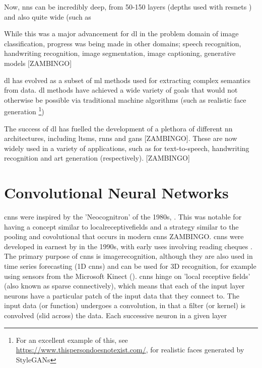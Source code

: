 Now, \gls{nn}s can be incredibly deep, from 50-150 layers (depths used with \gls{resnet}s \cite{resnet}) and also quite wide (such as 


While this was a major advancement for \gls{dl} in the problem domain of image classification, progress was being made in other domains; speech recognition, handwriting recognition, image segmentation, image captioning, generative models [ZAMBINGO] \bigskip %
 
\gls{dl} has evolved as a subset of \gls{ml} methods used for extracting complex semantics from data. \gls{dl} methods have achieved a wide variety of goals that would not otherwise be possible via traditional machine algorithms (such as realistic face generation \footnote{For an excellent example of this, see \url{https://www.thispersondoesnotexist.com/}, for realistic faces generated by StyleGANs})  \bigskip%

The success of  \gls{dl} has fuelled the development of a plethora of different  \gls{nn} architectures, including \gls{ltsm}s, \gls{rnn}s and \gls{gan}s [ZAMBINGO]. These are now widely used in a variety of applications, such as for text-to-speech, handwriting recognition and art generation (respectively). [ZAMBINGO]  \bigskip 

\section{Convolutional Neural Networks}

\gls{cnn}s were inspired by the 'Neocognitron' of the 1980s,\cite{neocognitron_proposal} \cite{neocognitron}. This was notable for having a concept similar to \gls{localreceptivefields} and a strategy similar to the pooling and covolutional that occurs in modern \gls{cnn}s ZAMBINGO. \gls{cnn}s were developed in earnest by in the 1990s, with early uses involving reading cheques \cite{lecun_cheques}. The primary purpose of \gls{cnn}s is \gls{imagerecognition}, although they are also used in time series forecasting (1D \gls{cnn}s) and can be used for 3D recognition, for example using sensors from the Microsoft Kinect (\cite{3d_conv}). \gls{cnn}s hinge on 'local receptive fields' (also known as sparse connectively), which means that each of the input layer neurons have a particular patch of the input data that they connect to. The input data (or function) undergoes a convolution, in that a filter (or kernel) is convolved (slid across) the data. Each successive \gls{neuron} in a given layer \cite[Chapter~5]{good_fellow_2016}

